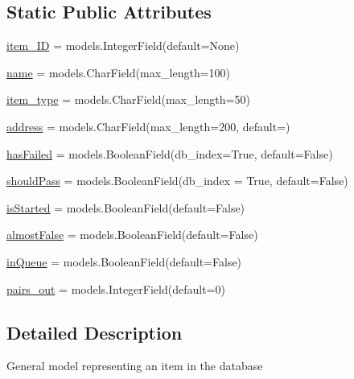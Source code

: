 \subsection*{Static Public Attributes}
\begin{DoxyCompactItemize}
\item 
\hyperlink{classdynamicfilterapp_1_1models_1_1_item_a32565a7f740a6d8f36b5e5d781463e15}{item\+\_\+\+ID} = models.\+Integer\+Field(default=None)
\item 
\hyperlink{classdynamicfilterapp_1_1models_1_1_item_ab74e6bf80237ddc4109968cedc58c151}{name} = models.\+Char\+Field(max\+\_\+length=100)
\item 
\hyperlink{classdynamicfilterapp_1_1models_1_1_item_a2679318a14061852e50df3c6e4e42f62}{item\+\_\+type} = models.\+Char\+Field(max\+\_\+length=50)
\item 
\hyperlink{classdynamicfilterapp_1_1models_1_1_item_ade5a18d52133ef21f211020ceb464c07}{address} = models.\+Char\+Field(max\+\_\+length=200, default=\textquotesingle{}\textquotesingle{})
\item 
\hyperlink{classdynamicfilterapp_1_1models_1_1_item_a5fa9cf9c305aeeef558cdf041085ccf1}{has\+Failed} = models.\+Boolean\+Field(db\+\_\+index=True, default=False)
\item 
\hyperlink{classdynamicfilterapp_1_1models_1_1_item_a1abc5225054f7c37dcefe2ca69594650}{should\+Pass} = models.\+Boolean\+Field(db\+\_\+index = True, default=False)
\item 
\hyperlink{classdynamicfilterapp_1_1models_1_1_item_a4dfad4da8b9c480e78a3ad161ce723f1}{is\+Started} = models.\+Boolean\+Field(default=False)
\item 
\hyperlink{classdynamicfilterapp_1_1models_1_1_item_a088a878065d2b8209b1c4a23f482b70a}{almost\+False} = models.\+Boolean\+Field(default=False)
\item 
\hyperlink{classdynamicfilterapp_1_1models_1_1_item_af5ba33bf8fddcc8f610ee2d0091ded53}{in\+Queue} = models.\+Boolean\+Field(default=False)
\item 
\hyperlink{classdynamicfilterapp_1_1models_1_1_item_a9290ec0d1f62bda2041497209d4f9895}{pairs\+\_\+out} = models.\+Integer\+Field(default=0)
\end{DoxyCompactItemize}


\subsection{Detailed Description}
\begin{DoxyVerb}General model representing an item in the database
\end{DoxyVerb}
 

